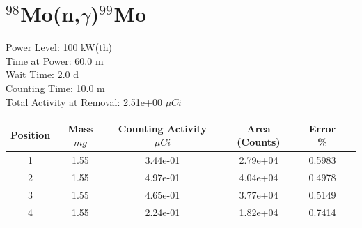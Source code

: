 \newpage

\section*{ $^{98}$Mo(n,$\gamma$)$^{99}$Mo }

Power Level: 100 kW(th) \\
Time at Power: 60.0 m \\
Wait Time:  2.0 d \\
Counting Time: 10.0 m \\
Total Activity at Removal: 2.51e+00 $\mu Ci$

\begin{table}[h]
\centering
\begin{tabular}{ |c|c|c|c|c|c| }
 \hline
 Position & Mass $mg$ & Counting Activity $\mu Ci$ & Area (Counts) & Error \% \\
 \hline 
 1 & 1.55 & 3.44e-01 & 2.79e+04 & 0.5983 \\ 
\hline
 2 & 1.55 & 4.97e-01 & 4.04e+04 & 0.4978 \\ 
\hline
 3 & 1.55 & 4.65e-01 & 3.77e+04 & 0.5149 \\ 
\hline
 4 & 1.55 & 2.24e-01 & 1.82e+04 & 0.7414 \\ 
\hline
\end{tabular}
\end{table}

